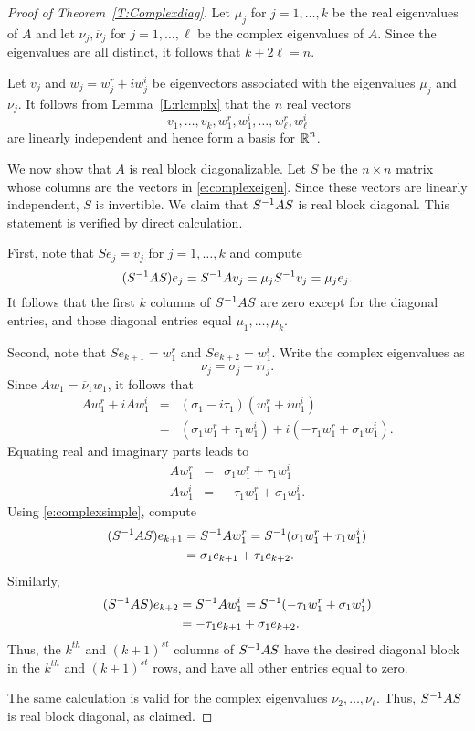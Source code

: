 \documentclass{ximera}
\begin{document}
\begin{proof}[Proof of Theorem~\ref{T:Complexdiag}]   Let $\mu_j$ for 
$j=1,\ldots,k$ be the real eigenvalues of $A$ and let 
$\nu_j,\overline{\nu}_j$ for $j=1,\ldots,\ell$ be the complex eigenvalues of 
$A$. Since the eigenvalues are all distinct, it follows that $k+2\ell=n$.

Let $v_j$ and $w_j=w_j^r+iw_j^i$ be eigenvectors associated with the 
eigenvalues $\mu_j$ and $\overline{\nu}_j$.  It follows from 
Lemma~\ref{L:rlcmplx} that the $n$ real vectors
\begin{equation}  \label{e:complexeigen}
v_1,\ldots,v_k,w_1^r,w_1^i,\ldots,w_\ell^r,w_\ell^i
\end{equation}
are linearly independent and hence form a basis for $\mbox{$\mathbb{R}$}^n$.

We now show that $A$ is real block diagonalizable.  Let $S$ be the $n\times
n$ matrix whose columns are the vectors in \eqref{e:complexeigen}.  Since
these vectors are linearly independent, $S$ is invertible.  We claim that 
$S^{-1} AS$ is real block diagonal.  This statement is verified by direct
calculation.

First, note that $Se_j=v_j$ for $j=1,\ldots,k$ and compute
\[
(S^{-1} AS)e_j = S^{-1} Av_j = \mu_j S^{-1} v_j = \mu_j e_j.
\]
It follows that the first $k$ columns of $S^{-1} AS$ are zero except for the 
diagonal entries, and those diagonal entries equal $\mu_1,\ldots,\mu_k$.

Second, note that $Se_{k+1}=w_1^r$ and $Se_{k+2}=w_1^i$.  Write the complex 
eigenvalues as
\[
\nu_j = \sigma_j+i\tau_j.
\]
Since 
$Aw_1 = \overline{\nu}_1w_1$, it follows that
\begin{eqnarray*}
Aw_1^r+iAw_1^i & = & (\sigma_1-i\tau_1)(w_1^r+iw_1^i)\\
& = & (\sigma_1w_1^r+\tau_1w_1^i) + i(-\tau_1w_1^r +\sigma_1w_1^i).
\end{eqnarray*}
Equating real and imaginary parts leads to 
\begin{equation}  \label{e:complexsimple}
\begin{array}{ccc} Aw_1^r & = & \sigma_1w_1^r+\tau_1w_1^i\\
Aw_1^i & = &   -\tau_1w_1^r+\sigma_1w_1^i. \end{array}
\end{equation}
Using \eqref{e:complexsimple}, compute
\begin{align*}
(S^{-1} AS)e_{k+1} &= S^{-1} Aw_1^r = S^{-1}(\sigma_1w_1^r+\tau_1w_1^i)  \\
&= \sigma_1e_{k+1} + \tau_1e_{k+2}.
\end{align*}
Similarly, 
\begin{align*}
(S^{-1} AS)e_{k+2} &= S^{-1} Aw_1^i = S^{-1}(-\tau_1w_1^r+\sigma_1w_1^i) \\
&= -\tau_1e_{k+1} + \sigma_1e_{k+2}.
\end{align*}
Thus, the $k^{th}$ and $(k+1)^{st}$ columns of $S^{-1} AS$ have the desired
diagonal block in the $k^{th}$ and $(k+1)^{st}$ rows, and have all other 
entries equal to zero.

The same calculation is valid for the complex eigenvalues 
$\nu_2,\ldots,\nu_\ell$.  Thus, $S^{-1} AS$ is real block diagonal, as 
claimed.   \end{proof}
\end{document}
